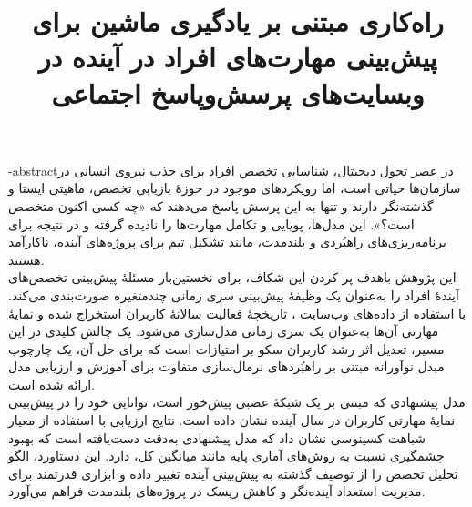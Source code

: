 \documentclass[oneside,openany,msc]{SBU-Thesis}
\begin{document}
	\title{راه‌کار‌ی مبتنی بر یادگیری ماشین برای پیش‌بینی مهارت‌های افراد در آینده در وبسایت‌های پرسش‌‌وپاسخ اجتماعی }	
	\subject{مهندسی کامپیوتر}
	
	

	
	

	

	

	

	\fa-abstract{در عصر تحول دیجیتال، شناسایی تخصص افراد برای جذب نیروی انسانی در سازمان‌ها حیاتی است، اما رویکردهای موجود در حوزهٔ بازیابی تخصص، ماهیتی ایستا و گذشته‌نگر دارند و تنها به این پرسش پاسخ می‌دهند که «چه کسی اکنون متخصص است؟». این مدل‌ها، پویایی و تکامل مهارت‌ها را نادیده گرفته و در نتیجه برای برنامه‌ریزی‌های راهبُردی و بلندمدت، مانند تشکیل تیم برای پروژه‌های آینده، ناکارآمد هستند.\\این پژوهش باهدف پر کردن این شکاف، برای نخستین‌بار مسئلهٔ پیش‌بینی تخصص‌های آیندهٔ افراد را به‌عنوان یک وظیفهٔ پیش‌بینی سری زمانی چندمتغیره صورت‌بندی می‌کند. با استفاده از داده‌های وب‌سایت ، تاریخچهٔ فعالیت سالانهٔ کاربران استخراج شده و نمایهٔ مهارتی آن‌ها به‌عنوان یک سری زمانی مدل‌سازی می‌شود. یک چالش کلیدی در این مسیر، تعدیل اثر رشد کاربران سکو بر امتیازات است که برای حل آن، یک چارچوب مبدل نوآورانه مبتنی بر راهبُردهای نرمال‌سازی متفاوت برای آموزش و ارزیابی مدل ارائه شده است.\\مدل پیشنهادی که مبتنی بر یک شبکهٔ عصبی پیش‌خور است، توانایی خود را در پیش‌بینی نمایهٔ مهارتی کاربران در سال آینده نشان داده است. نتایج ارزیابی با استفاده از معیار شباهت کسینوسی نشان داد که مدل پیشنهادی به‌دقت  دست‌یافته است که بهبود چشمگیری نسبت به‌ روش‌های آماری پایه مانند میانگین کل، دارد. این دستاورد، الگو تحلیل تخصص را از توصیف گذشته به پیش‌بینی آینده تغییر داده و ابزاری قدرتمند برای مدیریت استعداد آینده‌نگر و کاهش ریسک در پروژه‌های بلندمدت فراهم می‌آورد.}
	
\end{document}
